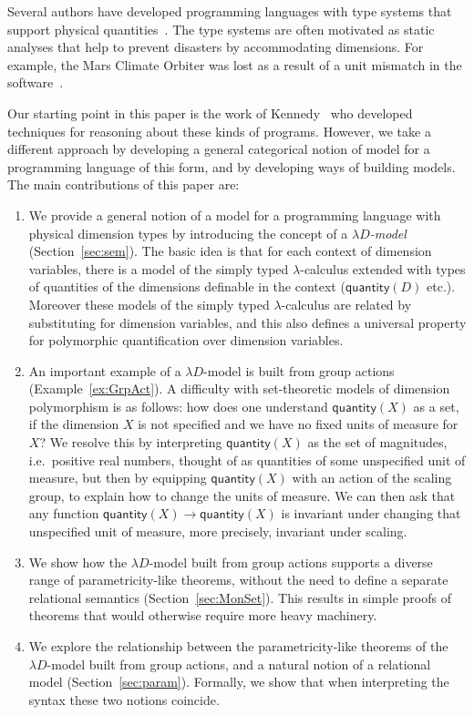 \documentclass[a4paper,UKenglish]{lipics}
\theoremstyle{plain}
\newcommand{\msf}[1]{\mathsf{#1}} %
\newcommand{\qnt}{\msf{quantity}}
\newcommand{\Dvar}{X}
\begin{document}
 Several authors have developed programming languages with type systems that support physical quantities~\cite{house1983proposal, manner1986strong, wand1991automatic, Kennedy:1997:RPU:263699.263761, erwig2002adding}. The type systems are often motivated as static analyses that help to prevent disasters by accommodating dimensions. For example, the Mars Climate Orbiter was lost as a result of a unit mismatch in the software~\cite{MarsCrash}.

Our starting point in this paper is the work of Kennedy~\cite{Kennedy:1997:RPU:263699.263761} who developed techniques for reasoning about these kinds of programs. However, we take a different approach by developing a general categorical notion of model for a programming language of this form, and by developing ways of building models. The main contributions of this paper are:
\begin{enumerate}
\item We provide a general notion of a model for a programming language with physical dimension types by introducing the concept of a \emph{$\lambda D$-model} (Section~\ref{sec:sem}). The basic idea is that for each context of dimension variables, there is a model of the simply typed $\lambda$-calculus extended with types of quantities of the dimensions definable in the context ($\qnt(D)$ etc.). Moreover these models of the simply typed $\lambda$-calculus are related by substituting for dimension variables, and this also defines a universal property for polymorphic quantification over dimension variables.

\item An important example of a $\lambda D$-model is built from group actions (Example~\ref{ex:GrpAct}).
A difficulty with set-theoretic models of dimension polymorphism is as follows: how does one understand $\qnt(\Dvar)$ as a set, if the dimension $\Dvar$ is not specified and we have no fixed units of measure for $\Dvar$? We resolve this by interpreting $\qnt(\Dvar)$ as the set of magnitudes, i.e.~positive real numbers, thought of as quantities of some unspecified unit of measure, but then by equipping $\qnt(\Dvar)$ with an action of the scaling group, to explain how to change the units of measure. We can then ask that any function $\qnt(\Dvar)\to\qnt(\Dvar)$ is invariant under changing that unspecified unit of measure, more precisely, invariant under scaling.

\item We show how the $\lambda D$-model built from group actions supports a diverse range of parametricity-like theorems, without the need to define a separate relational semantics (Section~\ref{sec:MonSet}). This results in simple proofs of theorems that would otherwise require more heavy machinery.

\item We explore the relationship between the parametricity-like theorems of the $\lambda D$-model built from group actions, and a natural notion of a relational model (Section~\ref{sec:param}). Formally, we show that when interpreting the syntax these two notions coincide.
\end{enumerate}
\end{document}
